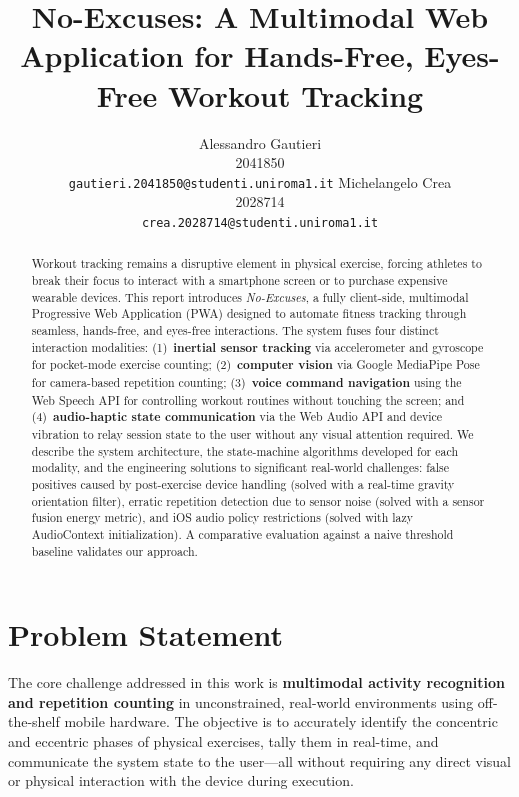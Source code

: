 \documentclass[11pt]{article}
\title{No-Excuses: A Multimodal Web Application for Hands-Free, Eyes-Free Workout Tracking}
\author{
  Alessandro Gautieri \\
  2041850 \\
  {\tt gautieri.2041850@studenti.uniroma1.it}
  \And
  Michelangelo Crea \\
  2028714 \\
  {\tt crea.2028714@studenti.uniroma1.it}
}
\date{}
\begin{document}
\maketitle

\begin{abstract}
Workout tracking remains a disruptive element in physical exercise, forcing athletes to break their focus to interact with a smartphone screen or to purchase expensive wearable devices. This report introduces \textit{No-Excuses}, a fully client-side, multimodal Progressive Web Application (PWA) designed to automate fitness tracking through seamless, hands-free, and eyes-free interactions. The system fuses four distinct interaction modalities: (1)~\textbf{inertial sensor tracking} via accelerometer and gyroscope for pocket-mode exercise counting; (2)~\textbf{computer vision} via Google MediaPipe Pose for camera-based repetition counting; (3)~\textbf{voice command navigation} using the Web Speech API for controlling workout routines without touching the screen; and (4)~\textbf{audio-haptic state communication} via the Web Audio API and device vibration to relay session state to the user without any visual attention required. We describe the system architecture, the state-machine algorithms developed for each modality, and the engineering solutions to significant real-world challenges: false positives caused by post-exercise device handling (solved with a real-time gravity orientation filter), erratic repetition detection due to sensor noise (solved with a sensor fusion energy metric), and iOS audio policy restrictions (solved with lazy AudioContext initialization). A comparative evaluation against a naive threshold baseline validates our approach.
\end{abstract}

\section{Problem Statement}

The core challenge addressed in this work is \textbf{multimodal activity recognition and repetition counting} in unconstrained, real-world environments using off-the-shelf mobile hardware. The objective is to accurately identify the concentric and eccentric phases of physical exercises, tally them in real-time, and communicate the system state to the user—all without requiring any direct visual or physical interaction with the device during execution.
\end{document}
